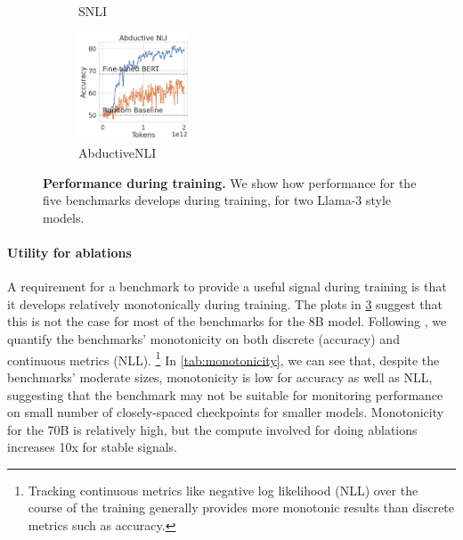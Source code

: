 \begin{figure}[t]
\begin{subfigure}[b]{0.19\textwidth}
    \caption{SNLI}
    \label{fig:snli_int}
    \end{subfigure}
    \begin{subfigure}[b]{0.19\textwidth}
    \centering
    \includegraphics[height=3.2cm, trim=11mm 0 0 0, clip]{figures/abductivenli_intermediate}
    \caption{AbductiveNLI}
    \label{fig:abductivenli_int}
    \end{subfigure}
    \caption{\textbf{Performance during training.} We show how performance for the five benchmarks develops during training, for two Llama-3 style models.}\label{fig:performance_training}
\end{figure}

\paragraph{Utility for ablations}
A requirement for a benchmark to provide a useful signal during training is that it develops relatively monotonically during training.
The plots in \cref{fig:performance_training} suggest that this is not the case for most of the benchmarks for the 8B model.
Following \citet{variancepaper}, we quantify the benchmarks' monotonicity on both discrete (accuracy) and continuous metrics (NLL).%
\footnote{Tracking continuous metrics like negative log likelihood (NLL) over the course of the training generally provides more monotonic results than discrete metrics such as accuracy.}
In \cref{tab:monotonicity}, we can see that, despite the benchmarks' moderate sizes, monotonicity is low for accuracy as well as NLL, suggesting that the benchmark may not be suitable for monitoring performance on small number of closely-spaced checkpoints for smaller models. Monotonicity for the 70B is relatively high, but the compute involved for doing ablations increases 10x for stable signals.

